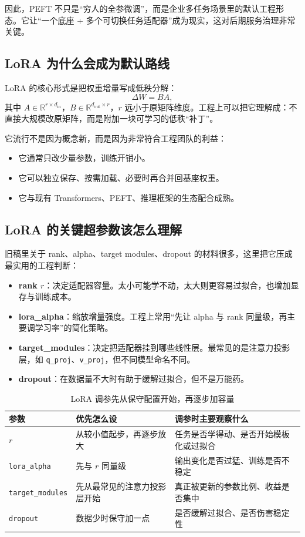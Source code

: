 因此，PEFT 不只是“穷人的全参微调”，而是企业多任务场景里的默认工程形态。它让“一个底座 + 多个可切换任务适配器”成为现实，这对后期服务治理非常关键。

\subsection{LoRA 为什么会成为默认路线}
LoRA 的核心形式是把权重增量写成低秩分解：
\[
\Delta W = BA,
\]
其中 \(A \in \mathbb{R}^{r \times d_{\mathrm{in}}}\)，\(B \in \mathbb{R}^{d_{\mathrm{out}} \times r}\)，\(r\) 远小于原矩阵维度。工程上可以把它理解成：不直接大规模改原矩阵，而是附加一块可学习的低秩“补丁”。

它流行不是因为概念新，而是因为非常符合工程团队的利益：
\begin{itemize}
  \item 它通常只改少量参数，训练开销小。
  \item 它可以独立保存、按需加载、必要时再合并回基座权重。
  \item 它与现有 Transformers、PEFT、推理框架的生态配合成熟。
\end{itemize}

\subsection{LoRA 的关键超参数该怎么理解}
旧稿里关于 rank、alpha、target modules、dropout 的材料很多，这里把它压成最实用的工程判断：
\begin{itemize}
  \item \textbf{rank \(r\)}：决定适配器容量。太小可能学不动，太大则更容易过拟合，也增加显存与训练成本。
  \item \textbf{lora\_alpha}：缩放增量强度。工程上常用“先让 alpha 与 rank 同量级，再主要调学习率”的简化策略。
  \item \textbf{target\_modules}：决定把适配器挂到哪些线性层。最常见的是注意力投影层，如 \texttt{q\_proj}、\texttt{v\_proj}，但不同模型命名不同。
  \item \textbf{dropout}：在数据量不大时有助于缓解过拟合，但不是万能药。
\end{itemize}

\begin{table}[H]
\centering
\small
\begin{tabularx}{\textwidth}{>{\raggedright\arraybackslash}p{2.6cm}>{\raggedright\arraybackslash}p{3.2cm}>{\raggedright\arraybackslash}X}
\toprule
\textbf{参数} & \textbf{优先怎么设} & \textbf{调参时主要观察什么} \\
\midrule
\(r\) & 从较小值起步，再逐步放大 & 任务是否学得动、是否开始模板化或过拟合 \\
\texttt{lora\_alpha} & 先与 \(r\) 同量级 & 输出变化是否过猛、训练是否不稳定 \\
\texttt{target\_modules} & 先从最常见的注意力投影层开始 & 真正被更新的参数比例、收益是否集中 \\
\texttt{dropout} & 数据少时保守加一点 & 是否缓解过拟合、是否伤害稳定性 \\
\bottomrule
\end{tabularx}
\caption{LoRA 调参先从保守配置开始，再逐步加容量}
\label{tab:lora-hyperparams}
\end{table}

